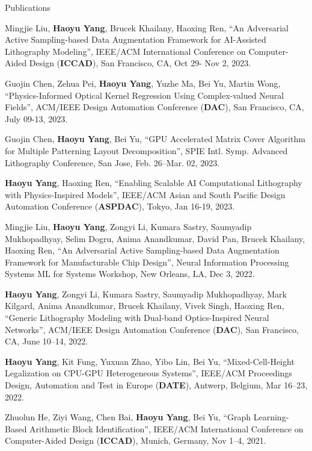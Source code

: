 \begin{rSection}{Publications}
\begin{description}[font=\normalfont]
		
	\item[{[C29]}] Mingjie Liu, \textbf{Haoyu Yang}, Brucek Khailany, Haoxing Ren, ``An Adversarial Active Sampling-based Data Augmentation Framework for AI-Assisted Lithography Modeling'', IEEE/ACM International Conference on Computer-Aided Design (\textbf{ICCAD}), San Francisco, CA, Oct 29- Nov 2, 2023.
	
	\item[{[C28]}] Guojin Chen, Zehua Pei, \textbf{Haoyu Yang}, Yuzhe Ma, Bei Yu, Martin Wong, ``Physics-Informed Optical Kernel Regression Using Complex-valued Neural Fields'', ACM/IEEE Design Automation Conference (\textbf{DAC}), San Francisco, CA, July 09-13, 2023.
	
		
	\item[{[C27]}] Guojin Chen, \textbf{Haoyu Yang}, Bei Yu, ``GPU Accelerated Matrix Cover Algorithm for Multiple Patterning Layout Decomposition'', SPIE Intl. Symp. Advanced Lithography Conference, San Jose, Feb. 26–Mar. 02, 2023.

	\item[{[C26]}] \textbf{Haoyu Yang}, Haoxing Ren, ``Enabling Scalable AI Computational Lithography with Physics-Inspired Models'', IEEE/ACM Asian and South Pacific Design Automation Conference (\textbf{ASPDAC}), Tokyo, Jan 16-19, 2023.
	
	\item[{[C25]}] Mingjie Liu, \textbf{Haoyu Yang}, Zongyi Li, Kumara Sastry, Saumyadip Mukhopadhyay, Selim Dogru, Anima Anandkumar, David Pan, Brucek Khailany, Haoxing Ren,
	``An Adversarial Active Sampling-based Data Augmentation Framework for Manufacturable Chip Design'',
	Neural Information Processing Systems ML for Systems Workshop, New Orleans, LA, Dec 3, 2022.
	
	\item[{[C24]}] \textbf{Haoyu Yang}, Zongyi Li, Kumara Sastry, Saumyadip Mukhopadhyay, Mark Kilgard, Anima Anandkumar, Brucek Khailany, Vivek Singh, Haoxing Ren,
	``Generic Lithography Modeling with Dual-band Optics-Inspired Neural Networks'',
	ACM/IEEE Design Automation Conference (\textbf{DAC}), San Francisco, CA, June 10–14, 2022.
	
	\item[{[C23]}] \textbf{Haoyu Yang}, Kit Fung, Yuxuan Zhao, Yibo Lin, Bei Yu,
	``Mixed-Cell-Height Legalization on CPU-GPU Heterogeneous Systems'',
	IEEE/ACM Proceedings Design, Automation and Test in Europe (\textbf{DATE}), Antwerp, Belgium, Mar 16–23, 2022.
	
	\item[{[C22]}] Zhuolun He, Ziyi Wang, Chen Bai, \textbf{Haoyu Yang}, Bei Yu, ``Graph Learning-Based Arithmetic Block Identification'',
	IEEE/ACM International Conference on Computer-Aided Design (\textbf{ICCAD}), Munich, Germany, Nov 1–4, 2021.
	

\end{description}
\end{rSection}
